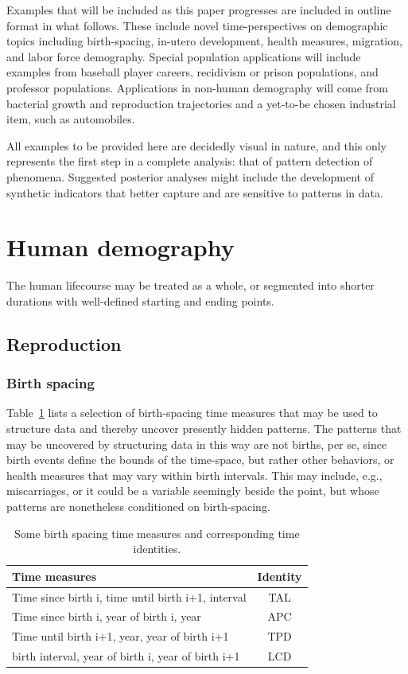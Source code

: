 \documentclass[11pt,oneside]{article} %
\begin{document}
Examples that will be included as this paper progresses are included in
outline format in what follows. These include novel time-perspectives on
demographic topics including birth-spacing, in-utero development, health
measures, migration, and labor force demography. Special population applications
will include examples from baseball player careers, recidivism or prison
populations, and professor populations. Applications in non-human demography
will come from bacterial growth and reproduction trajectories and a yet-to-be
chosen industrial item, such as automobiles.

All examples to be provided here are decidedly visual in nature, and this only
represents the first step in a complete analysis: that of pattern detection of
phenomena. Suggested posterior analyses might include the development of
synthetic indicators that better capture and are sensitive to patterns in data.

\section{Human demography}
The human lifecourse may be treated as a whole, or segmented into shorter
durations with well-defined starting and ending points. 

	\subsection{Reproduction}
	
		\subsubsection{Birth spacing}
		\FloatBarrier
		Table~\ref{tab:spacing} lists a selection of birth-spacing time measures that
		may be used to structure data and thereby uncover presently hidden patterns.
		The patterns that may be uncovered by structuring data in this way are not
		births, per se, since birth events define the bounds of the time-space, but
		rather other behaviors, or health measures that may vary within birth
		intervals. This may include, e.g., miscarriages, or it could be a variable
		seemingly beside the point, but whose patterns are nonetheless conditioned on
		birth-spacing.
		
		\begin{table}[h!]
		\caption{Some birth spacing time measures and corresponding time identities.}
	    \label{tab:spacing}
		\begin{tabular}{lc}
		Time measures & Identity \\ \hline
		Time since birth i, time until birth i+1, interval & TAL\\
		Time since birth i, year of birth i, year & APC\\
		Time until birth i+1, year, year of birth i+1 & TPD\\
		birth interval, year of birth i, year of birth i+1 & LCD
		\end{tabular}
		\end{table}
		
\end{document}

